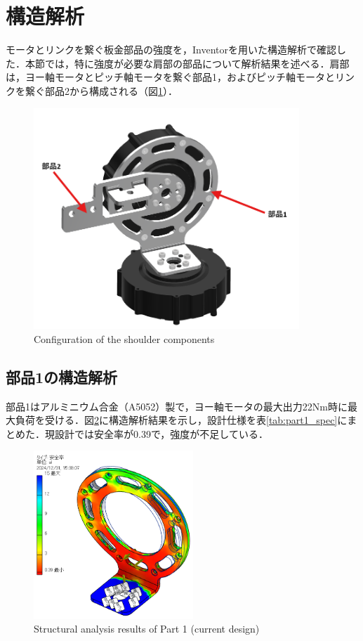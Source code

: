 \section{構造解析}
モータとリンクを繋ぐ板金部品の強度を，Inventorを用いた構造解析で確認した．本節では，特に強度が必要な肩部の部品について解析結果を述べる．肩部は，ヨー軸モータとピッチ軸モータを繋ぐ部品1，およびピッチ軸モータとリンクを繋ぐ部品2から構成される（図\ref{fig:shoulder}）．

\begin{figure}[h]
  \centering
  \includegraphics[width=10cm]{images/design/shoulder.png}
  \caption{Configuration of the shoulder components}
  \label{fig:shoulder}
\end{figure}

\subsection{部品1の構造解析}
部品1はアルミニウム合金（A5052）製で，ヨー軸モータの最大出力22Nm時に最大負荷を受ける．図\ref{fig:T3_40}に構造解析結果を示し，設計仕様を表\ref{tab:part1_spec}にまとめた．現設計では安全率が0.39で，強度が不足している．

\begin{figure}[h]
  \centering
  \includegraphics[width=6cm]{images/design/T3_40.png}
  \caption{Structural analysis results of Part 1 (current design)}
  \label{fig:T3_40}
\end{figure}

